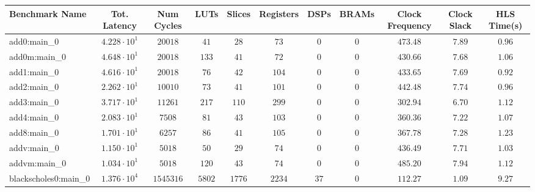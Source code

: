 \begin{tabular}{|l|c|c|c|c|c|c|c|c|c|c|}
\hline
Benchmark Name                 & Tot. Latency           & Num Cycles   & LUTs       & Slices     & Registers  & DSPs     & BRAMs    & Clock Frequency & Clock Slack & HLS Time(s) \\
\hline
add0:main\_0                   & $ 4.228 \cdot 10^{1} $ & $ 20018    $ & $ 41     $ & $ 28     $ & $ 73     $ & $ 0    $ & $ 0    $ & $ 473.48      $ & $ 7.89    $ & $ 0.96    $ \\
add0m:main\_0                  & $ 4.648 \cdot 10^{1} $ & $ 20018    $ & $ 133    $ & $ 41     $ & $ 72     $ & $ 0    $ & $ 0    $ & $ 430.66      $ & $ 7.68    $ & $ 1.06    $ \\
add1:main\_0                   & $ 4.616 \cdot 10^{1} $ & $ 20018    $ & $ 76     $ & $ 42     $ & $ 104    $ & $ 0    $ & $ 0    $ & $ 433.65      $ & $ 7.69    $ & $ 0.92    $ \\
add2:main\_0                   & $ 2.262 \cdot 10^{1} $ & $ 10010    $ & $ 73     $ & $ 41     $ & $ 101    $ & $ 0    $ & $ 0    $ & $ 442.48      $ & $ 7.74    $ & $ 0.96    $ \\
add3:main\_0                   & $ 3.717 \cdot 10^{1} $ & $ 11261    $ & $ 217    $ & $ 110    $ & $ 299    $ & $ 0    $ & $ 0    $ & $ 302.94      $ & $ 6.70    $ & $ 1.12    $ \\
add4:main\_0                   & $ 2.083 \cdot 10^{1} $ & $ 7508     $ & $ 81     $ & $ 43     $ & $ 103    $ & $ 0    $ & $ 0    $ & $ 360.36      $ & $ 7.22    $ & $ 1.07    $ \\
add8:main\_0                   & $ 1.701 \cdot 10^{1} $ & $ 6257     $ & $ 86     $ & $ 41     $ & $ 105    $ & $ 0    $ & $ 0    $ & $ 367.78      $ & $ 7.28    $ & $ 1.23    $ \\
addv:main\_0                   & $ 1.150 \cdot 10^{1} $ & $ 5018     $ & $ 50     $ & $ 29     $ & $ 74     $ & $ 0    $ & $ 0    $ & $ 436.49      $ & $ 7.71    $ & $ 1.03    $ \\
addvm:main\_0                  & $ 1.034 \cdot 10^{1} $ & $ 5018     $ & $ 120    $ & $ 43     $ & $ 74     $ & $ 0    $ & $ 0    $ & $ 485.20      $ & $ 7.94    $ & $ 1.12    $ \\
blackscholes0:main\_0          & $ 1.376 \cdot 10^{4} $ & $ 1545316  $ & $ 5802   $ & $ 1776   $ & $ 2234   $ & $ 37   $ & $ 0    $ & $ 112.27      $ & $ 1.09    $ & $ 9.27    $ \\

\end{tabular}
